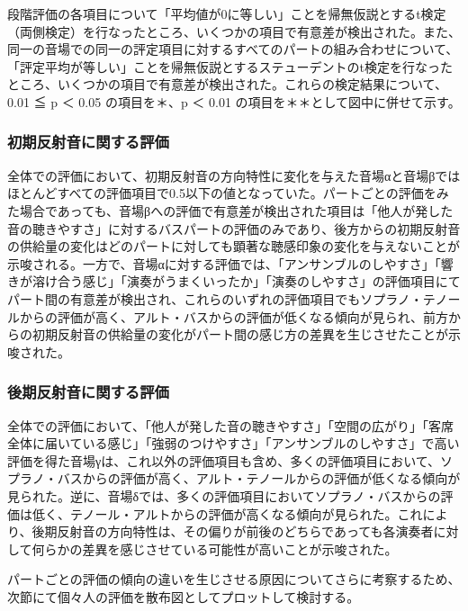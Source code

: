 \documentclass[11pt,a4j]{jreport}
\begin{document}
段階評価の各項目について「平均値が0に等しい」ことを帰無仮説とするt検定（両側検定）を行なったところ、いくつかの項目で有意差が検出された。また、同一の音場での同一の評定項目に対するすべてのパートの組み合わせについて、「評定平均が等しい」ことを帰無仮説とするステューデントのt検定を行なったところ、いくつかの項目で有意差が検出された。これらの検定結果について、0.01 ≦ p ＜ 0.05 の項目を＊、p ＜ 0.01 の項目を＊＊として図中に併せて示す。

\subsubsection*{初期反射音に関する評価}
全体での評価において、初期反射音の方向特性に変化を与えた音場αと音場βではほとんどすべての評価項目で0.5以下の値となっていた。パートごとの評価をみた場合であっても、音場βへの評価で有意差が検出された項目は「他人が発した音の聴きやすさ」に対するバスパートの評価のみであり、後方からの初期反射音の供給量の変化はどのパートに対しても顕著な聴感印象の変化を与えないことが示唆される。一方で、音場αに対する評価では、「アンサンブルのしやすさ」「響きが溶け合う感じ」「演奏がうまくいったか」「演奏のしやすさ」の評価項目にてパート間の有意差が検出され、これらのいずれの評価項目でもソプラノ・テノールからの評価が高く、アルト・バスからの評価が低くなる傾向が見られ、前方からの初期反射音の供給量の変化がパート間の感じ方の差異を生じさせたことが示唆された。

\subsubsection*{後期反射音に関する評価}
全体での評価において、「他人が発した音の聴きやすさ」「空間の広がり」「客席全体に届いている感じ」「強弱のつけやすさ」「アンサンブルのしやすさ」で高い評価を得た音場γは、これ以外の評価項目も含め、多くの評価項目において、ソプラノ・バスからの評価が高く、アルト・テノールからの評価が低くなる傾向が見られた。逆に、音場δでは、多くの評価項目においてソプラノ・バスからの評価は低く、テノール・アルトからの評価が高くなる傾向が見られた。これにより、後期反射音の方向特性は、その偏りが前後のどちらであっても各演奏者に対して何らかの差異を感じさせている可能性が高いことが示唆された。

パートごとの評価の傾向の違いを生じさせる原因についてさらに考察するため、次節にて個々人の評価を散布図としてプロットして検討する。
\end{document}
